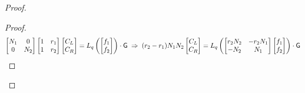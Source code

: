 \begin{proof}
\begin{proof}
\begin{equation*}
\begin{bmatrix}
N_1 & 0 \\
0 & N_2 \\
\end{bmatrix} 
\begin{bmatrix}
1 & r_1 \\
1 & r_2 \\
\end{bmatrix} 
\begin{bmatrix}
C_L \\
C_R \\
\end{bmatrix} 
= 
L_q \left(
\begin{bmatrix}
f_1 \\
f_2\\
\end{bmatrix} 
\right)
 \cdot \gr{G} 
\hspace{1mm}
\Rightarrow
\hspace{1mm}
(r_2 - r_1) N_1 N_2 
\begin{bmatrix}
C_L \\
C_R \\
\end{bmatrix}
= 
L_q\left(
\begin{bmatrix}
r_2 N_2 & -r_2 N_1 \\
-N_2 & N_1 \\
\end{bmatrix}
\begin{bmatrix}
f_1 \\
f_2 \\
\end{bmatrix}
\right)
\cdot  \gr{G}
\end{equation*} 


\end{proof}
\end{proof}
